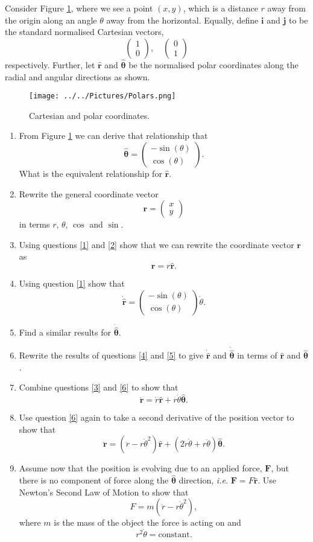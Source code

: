 \documentclass[]{article}
\newcommand{\myvec}[1]{\ensuremath{\begin{pmatrix}#1\end{pmatrix}}}
\newcommand{\bb}{\begin{equation}}
\newcommand{\ee}{\end{equation}}
\newcommand{\fig}[1]{Figure \ref{#1}}
\newcommand{\ie}{\emph{i.e.} }
\newcommand{\ttp}{.45\textwidth}
\renewcommand{\l}{\left(}
\renewcommand{\r}{\right)}
\begin{document}
Consider \fig{Polars}, where we see a point $(x,y)$, which is a distance $r$ away from the origin along an angle $\theta$ away from the horizontal. Equally, define $\bm{i}$ and $\bm{j}$ to be the standard normalised Cartesian vectors,
\bb
\myvec{1\\0}, \quad\myvec{0\\1}
\ee
respectively. Further, let $\hat{\bm{r}}$ and $\hat{\bm{\theta}}$ be the normalised polar coordinates along the radial and angular directions as shown.
\begin{figure}[h!!!tb]
\centering
\texttt{[image: ../../Pictures/Polars.png]}
\caption{\label{Polars} Cartesian and polar coordinates.}
\end{figure}
\begin{enumerate}
\item \label{1} From \fig{Polars} we can derive that relationship that
\bb
\hat{\bm{\theta}}=\myvec{-\sin(\theta)\\ \cos(\theta)}.
\ee
What is the equivalent relationship for $\hat{\bm{r}}$.
\item \label{2} Rewrite the general coordinate vector
\bb
\bm{r}=\myvec{x\\y}
\ee
in terms $r$, $\theta$, $\cos$ and $\sin$.
\item \label{3} Using questions \ref{1} and \ref{2} show that we can rewrite the coordinate vector $\bm{r}$ as
\bb
\bm{r}=r\hat{\bm{r}}.
\ee
\item \label{4} Using question \ref{1} show that
\bb
\dot{\hat{\bm{r}}}=\myvec{-\sin(\theta)\\\cos(\theta)}\dot{\theta}.
\ee
\item \label{5} Find a similar results for $\dot{\hat{\bm{\theta}}}$.
\item \label{6} Rewrite the results of questions \ref{4} and \ref{5} to give $\dot{\hat{\bm{r}}}$ and $\dot{\hat{\bm{\theta}}}$ in terms of $\hat{\bm{r}}$ and $\hat{\bm{\theta}}$.
\item \label{7} Combine questions \ref{3} and \ref{6} to show that
\bb
\dot{\bm{r}}=\dot{r}\hat{\bm{r}}+r\dot{\theta}\hat{\bm{\theta}}.
\ee
\item \label{8} Use question \ref{6} again to take a second derivative of the position vector to show that
\bb
\ddot{\bm{r}}=\l\ddot{r}-r\dot{\theta}^2\r\hat{\bm{r}}+\l 2\dot{r}\dot{\theta}+r\ddot{\theta}\r\hat{\bm{\theta}}.
\ee
\item \label{9} Assume now that the position is evolving due to an applied force, $\bm{F}$, but there is no component of force along the $\hat{\bm{\theta}}$ direction, \ie $\bm{F}=F\hat{\bm{r}}$. Use Newton's Second Law of Motion to show that
\bb
F=m\l\ddot{r}-r\dot{\theta}^2\r,
\ee
where $m$ is the mass of the object the force is acting on and
\bb
r^2\dot{\theta}=\textrm{constant}.\label{Kepler}
\ee
\end{enumerate}
\end{document}
